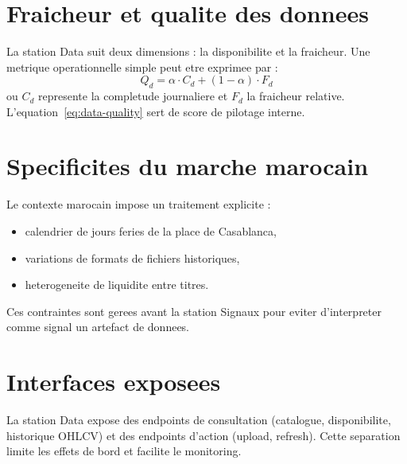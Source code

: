 \section{Fraicheur et qualite des donnees}
La station Data suit deux dimensions : la disponibilite et la fraicheur. Une
metrique operationnelle simple peut etre exprimee par :
\begin{equation}
Q_d = \alpha \cdot C_d + (1-\alpha)\cdot F_d
\label{eq:data-quality}
\end{equation}
ou $C_d$ represente la completude journaliere et $F_d$ la fraicheur relative.
L'equation~\ref{eq:data-quality} sert de score de pilotage interne.

\section{Specificites du marche marocain}
Le contexte marocain impose un traitement explicite :
\begin{itemize}
\item calendrier de jours feries de la place de Casablanca,
\item variations de formats de fichiers historiques,
\item heterogeneite de liquidite entre titres.
\end{itemize}
Ces contraintes sont gerees avant la station Signaux pour eviter
d'interpreter comme signal un artefact de donnees.

\section{Interfaces exposees}
La station Data expose des endpoints de consultation (catalogue, disponibilite,
historique OHLCV) et des endpoints d'action (upload, refresh). Cette separation
limite les effets de bord et facilite le monitoring.

